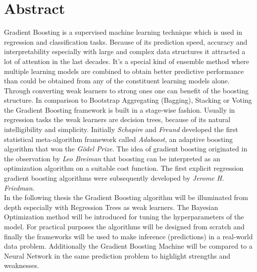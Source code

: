 \documentclass[12pt, a4paper]{article}
\begin{document}
\section*{Abstract}
Gradient Boosting is a supervised machine learning technique which is used in regression and classification tasks. Because of its prediction speed, accuracy and interpretability especially with large and complex data structures it attracted a lot of attention in the last decades. It's a special kind of ensemble method where multiple learning models are combined to obtain better predictive performance than could be obtained from any of the constituent learning models alone. Through converting weak learners to strong ones one can benefit of the boosting structure. In comparison to Bootstrap Aggregating (Bagging), Stacking or Voting the Gradient Boosting framework is built in a stage-wise fashion. Usually in regression tasks the weak learners are decision trees, because of its natural intelligibility and simplicity. Initially \textit{Schapire} and \textit{Freund} developed the first statistical meta-algorithm framework called \textit{Adaboost}, an adaptive boosting algorithm that won the \textit{Gödel Prize}. The idea of gradient boosting originated in the observation by \textit{Leo Breiman} that boosting can be interpreted as an optimization algorithm on a suitable cost function. The first explicit regression gradient boosting algorithms were subsequently developed by \textit{Jerome H. Friedman}. \\
In the following thesis the Gradient Boosting algorithm will be illuminated from depth especially with Regression Trees as weak learners. The Bayesian Optimization method will be introduced for tuning the hyperparameters of the model. For practical purposes the algorithms will be designed from scratch and finally the frameworks will be used to make inference (predictions) in a real-world data problem. Additionally the Gradient Boosting Machine will be compared to a Neural Network in the same prediction problem to highlight strengths and weaknesses.
\clearpage
\thispagestyle{empty}
\tableofcontents
\newpage
\clearpage
\setcounter{page}{1}
\end{document}
